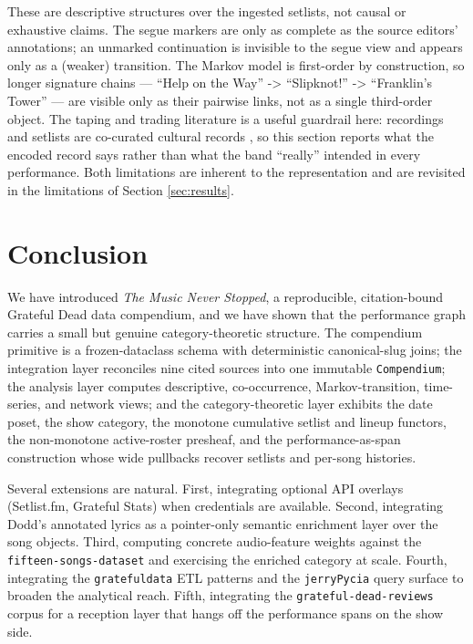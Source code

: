 \documentclass[
]{article}
\begin{document}
These are descriptive structures over the ingested setlists, not causal
or exhaustive claims. The segue markers are only as complete as the
source editors' annotations; an unmarked continuation is invisible to
the segue view and appears only as a (weaker) transition. The Markov
model is first-order by construction, so longer signature chains ---
``Help on the Way'' -\textgreater{} ``Slipknot!'' -\textgreater{}
``Franklin's Tower'' --- are visible only as their pairwise links, not
as a single third-order object. The taping and trading literature is a
useful guardrail here: recordings and setlists are co-curated cultural
records \citep{dead_net_taping_dead, wallace_cocreation_sound_archive},
so this section reports what the encoded record says rather than what
the band ``really'' intended in every performance. Both limitations are
inherent to the representation and are revisited in the limitations of
Section \ref{sec:results}.

\newpage

\section{Conclusion}\label{conclusion}

We have introduced \emph{The Music Never Stopped}, a reproducible,
citation-bound Grateful Dead data compendium, and we have shown that the
performance graph carries a small but genuine category-theoretic
structure. The compendium primitive is a frozen-dataclass schema with
deterministic canonical-slug joins; the integration layer reconciles
nine cited sources into one immutable \texttt{Compendium}; the analysis
layer computes descriptive, co-occurrence, Markov-transition,
time-series, and network views; and the category-theoretic layer
exhibits the date poset, the show category, the monotone cumulative
setlist and lineup functors, the non-monotone active-roster presheaf,
and the performance-as-span construction whose wide pullbacks recover
setlists and per-song histories.

Several extensions are natural. First, integrating optional API overlays
(Setlist.fm, Grateful Stats) when credentials are available. Second,
integrating Dodd's annotated lyrics
\citep{dodd_annotated_lyrics, billboard_lyric_book} as a pointer-only
semantic enrichment layer over the song objects. Third, computing
concrete audio-feature weights against the
\texttt{fifteen-songs-dataset} \citep{fifteen_songs_dataset} and
exercising the enriched category at scale. Fourth, integrating the
\texttt{gratefuldata} ETL patterns \citep{grateful_data_tutorial} and
the \texttt{jerryPycia} query surface \citep{jerry_pycia} to broaden the
analytical reach. Fifth, integrating the \texttt{grateful-dead-reviews}
corpus \citep{gd_reviews_corpus} for a reception layer that hangs off
the performance spans on the show side.
\end{document}
